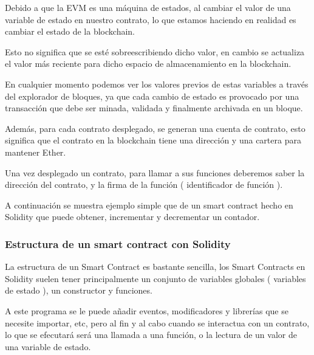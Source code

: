 \bigskip

Debido a que la EVM es una máquina de estados, al cambiar el valor de una variable de estado en nuestro contrato, lo que estamos haciendo en realidad es cambiar el estado de la blockchain.

\bigskip

Esto no significa que se esté sobreescribiendo dicho valor, en cambio se actualiza el valor más reciente para dicho espacio de almacenamiento en la blockchain.

\bigskip

En cualquier momento podemos ver los valores previos de estas variables a través del explorador de bloques, ya que cada cambio de estado es provocado por una transacción que debe ser minada, validada y finalmente archivada en un bloque.

\bigskip

Además, para cada contrato desplegado, se generan una cuenta de contrato, esto significa que el contrato en la blockchain tiene una dirección y una cartera para mantener Ether.

\bigskip

Una vez desplegado un contrato, para llamar a sus funciones deberemos saber la dirección del contrato, y la firma de la función ( identificador de función ).

\bigskip

A continuación se muestra ejemplo simple que de un smart contract hecho en Solidity que puede obtener, incrementar y decrementar un contador.

\bigskip




\subsubsection{Estructura de un smart contract con Solidity}

La estructura de un Smart Contract es bastante sencilla, los Smart Contracts en Solidity suelen tener principalmente un conjunto de variables globales ( variables de estado ), un constructor y funciones. 

\bigskip

A este programa se le puede añadir eventos, modificadores y librerías que se necesite importar, etc, pero al fin y al cabo cuando se interactua con un contrato, lo que se efecutará será una llamada a una función, o la lectura de un valor de una variable de estado.

